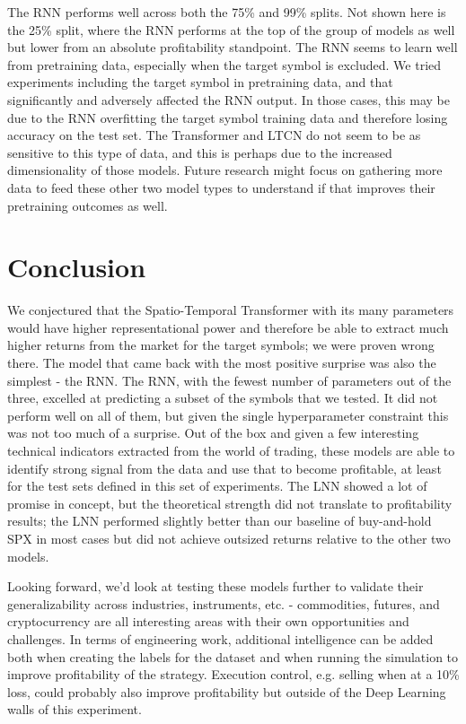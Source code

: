 \documentclass[10pt,twocolumn,letterpaper]{article}
\begin{document}
The RNN performs well across both the 75\% and 99\% splits. Not shown here is the 25\% split, where the RNN performs at the top of the group of models as well but lower from an absolute profitability standpoint. The RNN seems to learn well from pretraining data, especially when the target symbol is excluded. We tried experiments including the target symbol in pretraining data, and that significantly and adversely affected the RNN output. In those cases, this may be due to the RNN overfitting the target symbol training data and therefore losing accuracy on the test set. The Transformer and LTCN do not seem to be as sensitive to this type of data, and this is perhaps due to the increased dimensionality of those models. Future research might focus on gathering more data to feed these other two model types to understand if that improves their pretraining outcomes as well.

\section{Conclusion}

We conjectured that the Spatio-Temporal Transformer with its many parameters would have higher representational power and therefore be able to extract much higher returns from the market for the target symbols; we were proven wrong there. The model that came back with the most positive surprise was also the simplest - the RNN. The RNN, with the fewest number of parameters out of the three, excelled at predicting a subset of the symbols that we tested. It did not perform well on all of them, but given the single hyperparameter constraint this was not too much of a surprise. Out of the box and given a few interesting technical indicators extracted from the world of trading, these models are able to identify strong signal from the data and use that to become profitable, at least for the test sets defined in this set of experiments. The LNN showed a lot of promise in concept, but the theoretical strength did not translate to profitability results; the LNN performed slightly better than our baseline of buy-and-hold SPX in most cases but did not achieve outsized returns relative to the other two models.

Looking forward, we’d look at testing these models further to validate their generalizability across industries, instruments, etc. - commodities, futures, and cryptocurrency are all interesting areas with their own opportunities and challenges. In terms of engineering work, additional intelligence can be added both when creating the labels for the dataset and when running the simulation to improve profitability of the strategy. Execution control, e.g. selling when at a 10\% loss, could probably also improve profitability but outside of the Deep Learning walls of this experiment.
\end{document}
